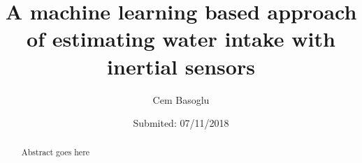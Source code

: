 \documentclass[twocolumn,fleqn,runningheads]{template/svjour2}[23.12.1232]
\begin{document}
\title{A machine learning based approach of estimating water intake with inertial sensors}

\author{Cem Basoglu}


\date{Submited: 07/11/2018}

\maketitle

\begin{abstract}
Abstract goes here
\end{abstract}










\end{document}
